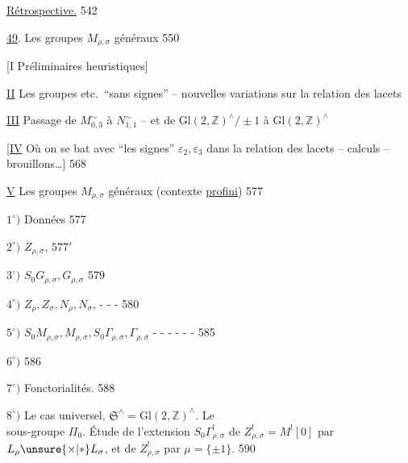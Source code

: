  \uline{Rétrospective.} \hfill 542



\uline{49}. Les groupes \(M_{\rho,\sigma}\) généraux \hfill 550

[I Préliminaires heuristiques]

\uline{II} Les groupes  etc.\ ``sans signes'' -- nouvelles
variations sur la relation des lacets \hfill {}

\uline{III} Passage de \(M_{0,3}^{\sim}\) à \(N_{1,1}^{\sim}\) -- et de
\(\mathrm{Gl}(2,\mathbb Z)^{\wedge}/\pm1\) à \(\mathrm{Gl}(2,\mathbb Z)^{\wedge}\) \hfill {}

[\uline{IV} Où on se bat avec ``les signes'' \(\varepsilon_2,\varepsilon_3\)
dans la relation des lacets -- calculs -- brouillons\ldots] \hfill 568 

\textcircled{\uline{V}} Les groupes \(M_{\rho,\sigma}\) généraux
(contexte \uline{profini}) \hfill 577

\(1^{\circ})\) Données \hfill 577

\(2^{\circ})\) \(Z_{\rho,\sigma}\), \unsure{\(\sigma_{\rho,\sigma}\)|\(\delta_{\rho,\sigma}\)} \hfill \(577'\)

\(3^{\circ})\) \(S_0G_{\rho,\sigma},G_{\rho,\sigma}\) \hfill 579

\(4^{\circ})\) \(Z_\rho,Z_\sigma,N_\rho,N_\sigma\),
 \hfill - - - 580

\(5^{\circ})\) \(S_0M_{\rho,\sigma},M_{\rho,\sigma},S_0\Gamma_{\rho,\sigma},\Gamma_{\rho,\sigma}\)
\hfill - - - - - - 585

\(6^{\circ})\) 
\hfill 586

\(7^{\circ})\) Fonctorialités. \hfill 588

\uline{\(8^{\circ})\)} Le cas universel, \(\mathfrak S^{\wedge}\)\(=\mathrm{Gl}(2,\mathbb Z)^{\wedge}\). Le
\hfill {}\\
 sous-groupe \(\Pi_0\). Étude de l'extension
\(S_0\Gamma_{\rho,\sigma}^{!}\) de \(Z_{\rho,\sigma}^{!}=M^{!}[0]\) par
\(L_\rho\unsure{\times|*}L_\sigma\), et  de
\(Z_{\rho,\sigma}^{!}\) par \(\mu=\{\pm1\}\).
\hfill {} 590

